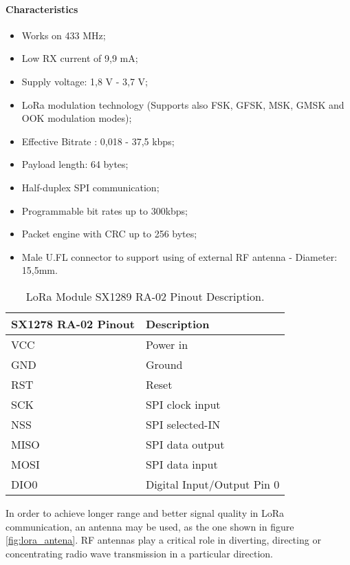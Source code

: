 \paragraph*{Characteristics}
\begin{itemize}
	\item Works on 433 MHz;
	\item Low RX current of 9,9 mA;
	\item Supply voltage: 1,8 V - 3,7 V;
	\item LoRa modulation technology (Supports also FSK, GFSK, MSK, GMSK and OOK modulation modes);
	\item Effective Bitrate : 0,018 - 37,5 kbps;
	\item Payload length: 64 bytes;
	\item Half-duplex SPI communication;
	\item Programmable bit rates up to 300kbps;
	\item Packet engine with CRC up to 256 bytes;
	\item Male U.FL connector to support using of external RF antenna - Diameter: 15,5mm.
\end{itemize}

\begin{table}[H]
	\centering
		\begin{tabular}{|m{5cm}|m{6cm}|}
			\hline
			\textbf{SX1278 RA-02 Pinout} & \textbf{Description}
			\\\hline\hline
		
			VCC & Power in\\\hline
			GND & Ground\\\hline
			RST & Reset \\\hline
			SCK & SPI clock input\\\hline
			NSS & SPI selected-IN\\\hline
			MISO & SPI data output\\\hline
			MOSI & SPI data input\\\hline
			DIO0 & Digital Input/Output Pin 0\\\hline
		\end{tabular}
	
	\caption{LoRa Module SX1289 RA-02 Pinout Description.}
	\label{table:lora_module_pinout}
\end{table}

In order to achieve longer range and better signal quality in LoRa communication, an antenna may be used, as the one shown in figure \ref{fig:lora_antena}. RF antennas play a critical role in diverting, directing or concentrating radio wave transmission in a particular direction. 

